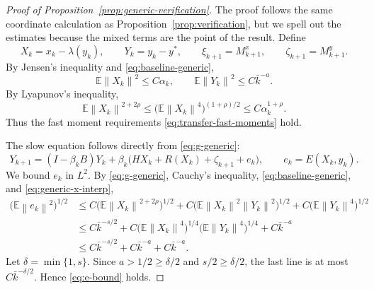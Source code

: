 \documentclass{article}
\newcommand{\E}{\mathbb{E}}
\newcommand{\norm}[1]{\left\lVert #1\right\rVert}
\begin{document}
\begin{proof}[Proof of Proposition~\ref{prop:generic-verification}]
The proof follows the same coordinate calculation as Proposition~\ref{prop:verification}, but we spell out the estimates because the mixed terms are the point of the result. Define
\[
  X_k=x_k-\lambda(y_k),
  \qquad
  Y_k=y_k-y^*,
  \qquad
  \xi_{k+1}=M^x_{k+1},
  \qquad
  \zeta_{k+1}=M^y_{k+1}.
\]
By Jensen's inequality and \eqref{eq:baseline-generic},
\begin{equation}
  \E\norm{X_k}^2\le C\alpha_k,
  \qquad
  \E\norm{Y_k}^2\le C\bar k^{-a}. \label{eq:generic-second-moments}
\end{equation}
By Lyapunov's inequality,
\begin{equation}
  \E\norm{X_k}^{2+2\rho}
  \le \big(\E\norm{X_k}^4\big)^{(1+\rho)/2}
  \le C\alpha_k^{1+\rho}. \label{eq:generic-x-interp}
\end{equation}
Thus the fast moment requirements \eqref{eq:transfer-fast-moments} hold.

The slow equation follows directly from \eqref{eq:g-generic}:
\[
  Y_{k+1}=(I-\beta_kB)Y_k+\beta_k\big(HX_k+R(X_k)+\zeta_{k+1}+e_k\big),
  \qquad
  e_k=E(X_k,y_k).
\]
We bound $e_k$ in $L^2$. By \eqref{eq:g-generic}, Cauchy's inequality, \eqref{eq:baseline-generic}, and \eqref{eq:generic-x-interp},
\begin{align*}
  \big(\E\norm{e_k}^2\big)^{1/2}
  &\le C\big(\E\norm{X_k}^{2+2\rho}\big)^{1/2}
       +C\big(\E\norm{X_k}^2\norm{Y_k}^2\big)^{1/2}
       +C\big(\E\norm{Y_k}^4\big)^{1/2}\\
  &\le C\bar k^{-s/2}
       +C\big(\E\norm{X_k}^4\big)^{1/4}\big(\E\norm{Y_k}^4\big)^{1/4}
       +C\bar k^{-a}\\
  &\le C\bar k^{-s/2}+C\bar k^{-a}+C\bar k^{-a}.
\end{align*}
Let $\delta=\min\{1,s\}$. Since $a>1/2\ge \delta/2$ and $s/2\ge \delta/2$, the last line is at most $C\bar k^{-\delta/2}$. Hence \eqref{eq:e-bound} holds.


\end{proof}
\end{document}
